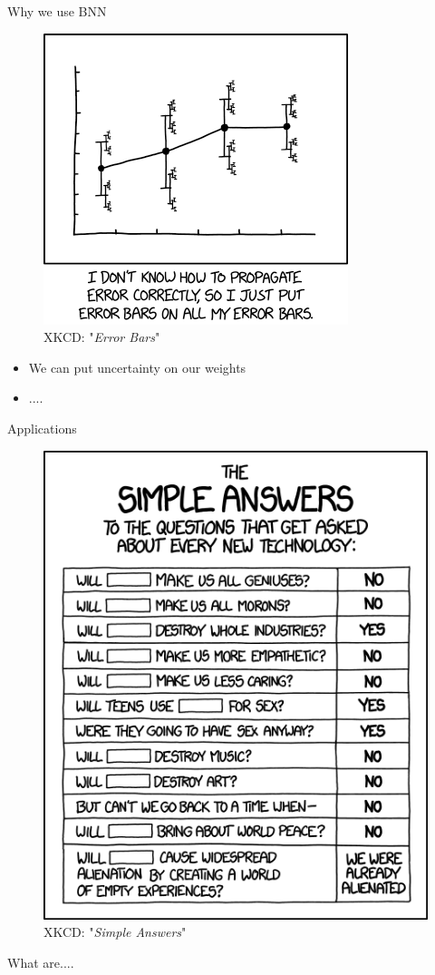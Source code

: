 \documentclass{beamer}
\begin{document}
\begin{frame}{Why we use BNN}
	\begin{multicols}{2}
		\begin{figure}
			\includegraphics[width=.45\textwidth]{../Images/xkcd_error_bars.png}
			\caption{XKCD: "\textit{Error Bars}" \cite{xkcd-self-driving}}
		\end{figure}
		
		\columnbreak
		
		\null \vfill
		\begin{itemize}
			\item We can put uncertainty on our weights
			\item ....
		\end{itemize}
		\vfill \null
	\end{multicols}
\end{frame}

\begin{frame}{Applications}
	\begin{multicols}{2}
		\begin{figure}
			\includegraphics[width=.4\textwidth]{../Images/xkcd_simple_answers.png}
			\caption{XKCD: "\textit{Simple Answers}" \cite{xkcd-simple-answers}}
		\end{figure}
		
		\columnbreak
		
		\null \vfill
		
		What are....
		
		
		\vfill \null
	\end{multicols}
\end{frame}
\end{document}
